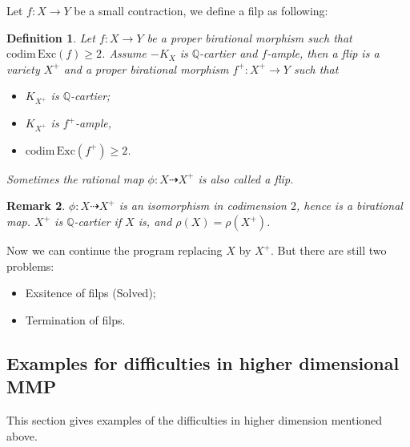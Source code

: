 \documentclass{article}
\newtheorem{defn}{Definition}[section]
\newtheorem{rmk}[defn]{Remark}
\begin{document}
Let $ f:X\to Y $ be a small contraction, we define a filp as following:
\begin{defn}
  Let $ f:X\to Y $ be a proper birational morphism such that $ \mathrm{codim}\,\mathrm{Exc}(f)\geqslant 2 $. Assume  $ -K_X $ is $ \mathbb{Q} $-cartier and $ f $-ample, then a \emph{flip} is a variety $ X^+ $ and a proper birational morphism $ f^+:X^+\to Y $ such that
  \begin{itemize}
    \item $ K_{X^+} $ is $ \mathbb{Q} $-cartier;
    \item $ K_{X^+} $ is $ f^+ $-ample,
    \item $ \mathrm{codim}\,\mathrm{Exc}(f^+)\geqslant 2 $.
  \end{itemize}
  Sometimes the rational map $ \phi:X\dashrightarrow X^+ $ is also called a flip.
\end{defn}
\begin{rmk}
  $ \phi:X\dashrightarrow X^+ $ is an isomorphism in codimension $ 2 $, hence is a birational map. $ X^+ $ is $ \mathbb{Q} $-cartier if $ X $ is, and $ \rho(X)=\rho(X^+) $.
\end{rmk}
Now we can continue the program  replacing $ X $ by $ X^+ $. But there are still two problems:
\begin{itemize}
  \item Exsitence of filps (Solved);
  \item Termination of filps.
\end{itemize}

\subsection{Examples for difficulties in higher dimensional MMP}
This section gives examples of the difficulties in higher dimension mentioned above.
\end{document}
